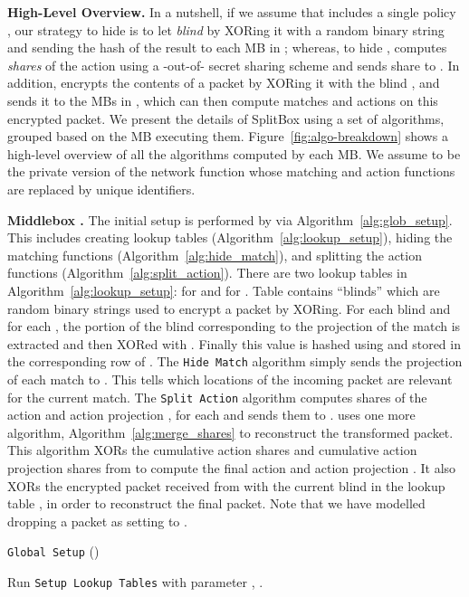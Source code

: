 \RequirePackage{fix-cm} \let\oldvec\vec \documentclass{sig-alternate-05-2015}
\newcommand{\descr}[1]{\smallskip \noindent \textbf{#1}}
\begin{document}
{{\descr{High-Level Overview.}
In a nutshell, if we assume that  includes a single policy , our strategy to hide  
is to let  \emph{blind}  by XORing it with a random binary string  and sending the hash of the result to each MB in ; whereas, to hide ,  computes  \emph{shares} of the action  using a -out-of- secret sharing scheme and sends share  to . In addition,  encrypts the contents of a packet  by XORing it with the blind , and sends it to the MBs in , which can then compute matches and actions on this encrypted packet. 
We present the details of SplitBox using a set of algorithms, grouped based on the MB executing them. Figure~\ref{fig:algo-breakdown} shows a high-level overview of all the algorithms computed by each MB. We assume  to be the private version of the network function  whose matching and action functions are replaced by unique identifiers. 


\descr{Middlebox \texorpdfstring{}{C)}.}
The initial setup is performed by  via Algorithm~\ref{alg:glob_setup}.
This includes creating lookup tables (Algorithm~\ref{alg:lookup_setup}), hiding
the matching functions (Algorithm~\ref{alg:hide_match}), and splitting the
action functions (Algorithm~\ref{alg:split_action}). There are two lookup
tables in Algorithm~\ref{alg:lookup_setup}:  for  and
 for . Table  contains  ``blinds'' which are random
binary strings used to encrypt a packet by XORing. For each blind  and
for each , the portion of the blind corresponding to the projection of
the match  is extracted and then XORed with . Finally this value is
hashed using  and stored in the corresponding row of .
The \texttt{Hide Match} algorithm simply sends the projection  of each
match  to . This tells  which locations of the incoming
packet are relevant for the current match. The \texttt{Split Action} algorithm
computes  shares of the action  and action projection ,
for each  and sends them to .  uses one more algorithm,
Algorithm~\ref{alg:merge_shares} to reconstruct the transformed packet. This
algorithm XORs the cumulative action shares  and cumulative action
projection shares  from  to compute the final action
 and action projection . It also XORs the
encrypted packet received from  with the current blind  in the lookup table , in order to
reconstruct the final packet. Note that we have modelled dropping a packet as setting  to . 

\begin{algorithm}[t]
\caption{\texttt{Global Setup} ()}
\label{alg:glob_setup}
\SetAlgoLined
{}
\SetAlCapSkip{1em}
\DontPrintSemicolon{}
\let\oldnl\nl \newcommand{\nonl}{\renewcommand{\nl}{\let\nl\oldnl}}
Run \texttt{Setup Lookup Tables} with parameter , .\;
\end{algorithm}

}}
\end{document}
